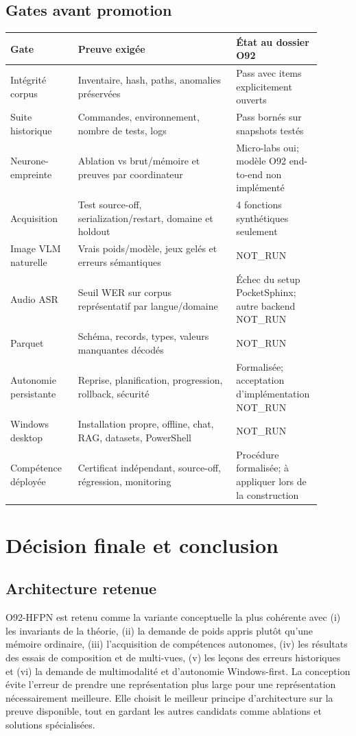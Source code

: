 \documentclass[11pt,a4paper]{report}
\begin{document}
\section{Gates avant promotion}
\begin{longtable}{p{0.21\linewidth}p{0.49\linewidth}p{0.20\linewidth}}
\toprule
\textbf{Gate} & \textbf{Preuve exigée} & \textbf{État au dossier O92}\\
\midrule
Intégrité corpus & Inventaire, hash, paths, anomalies préservées & Pass avec items explicitement ouverts\\
Suite historique & Commandes, environnement, nombre de tests, logs & Pass bornés sur snapshots testés\\
Neurone-empreinte & Ablation vs brut/mémoire et preuves par coordinateur & Micro-labs oui; modèle O92 end-to-end non implémenté\\
Acquisition & Test source-off, serialization/restart, domaine et holdout & 4 fonctions synthétiques seulement\\
Image VLM naturelle & Vrais poids/modèle, jeux gelés et erreurs sémantiques & NOT\_RUN\\
Audio ASR & Seuil WER sur corpus représentatif par langue/domaine & Échec du setup PocketSphinx; autre backend NOT\_RUN\\
Parquet & Schéma, records, types, valeurs manquantes décodés & NOT\_RUN\\
Autonomie persistante & Reprise, planification, progression, rollback, sécurité & Formalisée; acceptation d'implémentation NOT\_RUN\\
Windows desktop & Installation propre, offline, chat, RAG, datasets, PowerShell & NOT\_RUN\\
Compétence déployée & Certificat indépendant, source-off, régression, monitoring & Procédure formalisée; à appliquer lors de la construction\\
\bottomrule
\end{longtable}

\chapter{Décision finale et conclusion}
\section{Architecture retenue}
O92-HFPN est retenu comme la variante conceptuelle la plus cohérente avec (i) les invariants de la théorie, (ii) la demande de poids appris plutôt qu'une mémoire ordinaire, (iii) l'acquisition de compétences autonomes, (iv) les résultats des essais de composition et de multi-vues, (v) les leçons des erreurs historiques et (vi) la demande de multimodalité et d'autonomie Windows-first. La conception évite l'erreur de prendre une représentation plus large pour une représentation nécessairement meilleure. Elle choisit le meilleur principe d'architecture sur la preuve disponible, tout en gardant les autres candidats comme ablations et solutions spécialisées.
\end{document}
